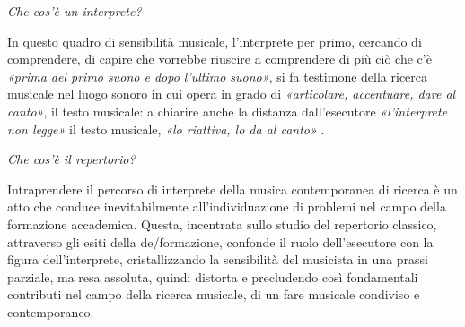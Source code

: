 \documentclass{gs-adonis}
\begin{document}
\emph{Che cos'è un interprete?}

In questo quadro di sensibilità musicale, l'interprete per primo, cercando di
comprendere, di capire che vorrebbe riuscire a comprendere di più ciò che c'è
\emph{«prima del primo suono e dopo l'ultimo suono»}, si fa testimone della
ricerca musicale nel luogo sonoro in cui opera in grado di
\emph{«articolare, accentuare, dare al canto»}, il testo musicale: a chiarire
anche la distanza dall'esecutore \emph{«l'interprete non legge»} il testo
musicale, \emph{«lo riattiva, lo da al canto»} \cite{Cacciari1995}.

\emph{Che cos'è il repertorio?}

Intraprendere il percorso di interprete della musica contemporanea di ricerca è
un atto che conduce inevitabilmente all'individuazione di problemi nel campo
della formazione accademica. Questa, incentrata sullo studio del repertorio
classico, attraverso gli esiti della de/formazione, confonde il ruolo
dell'esecutore con la figura dell'interprete, %
cristallizzando la sensibilità del musicista in una prassi parziale, ma resa
assoluta, quindi distorta e precludendo così fondamentali contributi nel campo
della ricerca musicale, di un fare musicale condiviso e contemporaneo.


%

%
\end{document}
